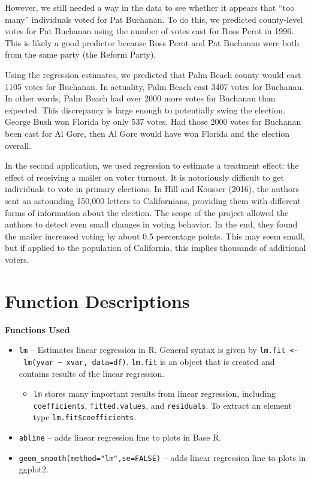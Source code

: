 \documentclass[
]{book}
\providecommand{\tightlist}{%
  \setlength{\itemsep}{0pt}\setlength{\parskip}{0pt}}
\begin{document}
However, we still needed a way in the data to see whether it appears that ``too many'' individuals voted for Pat Buchanan. To do this, we predicted county-level votes for Pat Buchanan using the number of votes cast for Ross Perot in 1996. This is likely a good predictor because Ross Perot and Pat Buchanan were both from the same party (the Reform Party).

Using the regression estimates, we predicted that Palm Beach county would cast 1105 votes for Buchanan. In actuality, Palm Beach cast 3407 votes for Buchanan. In other words, Palm Beach had over 2000 more votes for Buchanan than expected. This discrepancy is large enough to potentially swing the election. George Bush won Florida by only 537 votes. Had those 2000 votes for Buchanan been cast for Al Gore, then Al Gore would have won Florida and the election overall.

In the second application, we used regression to estimate a treatment effect: the effect of receiving a mailer on voter turnout. It is notoriously difficult to get individuals to vote in primary elections. In Hill and Kousser (2016), the authors sent an astounding 150,000 letters to Californians, providing them with different forms of information about the election. The scope of the project allowed the authors to detect even small changes in voting behavior. In the end, they found the mailer increased voting by about 0.5 percentage points. This may seem small, but if applied to the population of California, this implies thousands of additional voters.

\section*{Function Descriptions}\label{function-descriptions-3}

\textbf{Functions Used}

\begin{itemize}
\item
  \texttt{lm} -- Estimates linear regression in R. General syntax is given by \texttt{lm.fit\ \textless{}-\ lm(yvar\ \textasciitilde{}\ xvar,\ data=df)}. \texttt{lm.fit} is an object that is created and contains results of the linear regression.

  \begin{itemize}
  \tightlist
  \item
    \texttt{lm} stores many important results from linear regression, including \texttt{coefficients}, \texttt{fitted.values}, and \texttt{residuals}. To extract an element type \texttt{lm.fit\$coefficients}.
  \end{itemize}
\item
  \texttt{abline} -- adds linear regression line to plots in Base R.
\item
  \texttt{geom\_smooth(method="lm",se=FALSE)} -- adds linear regression line to plots in ggplot2.
\end{itemize}
\end{document}
